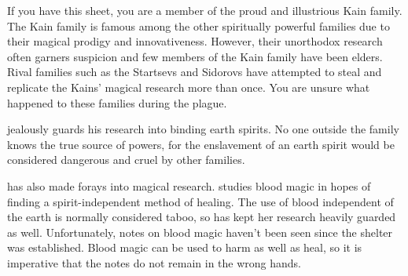 \documentclass[blue]{Pestilence}
\begin{document}
\name{\bKain{}}

If you have this sheet, you are a member of the proud and illustrious Kain family. The Kain family is famous among the other spiritually powerful families due to their magical prodigy and innovativeness. However, their unorthodox research often garners suspicion and few members of the Kain family have been elders. Rival families such as the Startsevs and Sidorovs have attempted to steal and replicate the Kains' magical research more than once. You are unsure what happened to these families during the plague.

\cElder{\intro} jealously guards his research into binding earth spirits. No one outside the family knows the true source of \cElder{\their} powers, for the enslavement of an earth spirit would be considered dangerous and cruel by other families.

 \cRebel{\intro} has also made forays into magical research. \cRebel{\They} studies blood magic in hopes of finding a spirit-independent method of healing. The use of blood independent of the earth is normally considered taboo, so \cRebel{\they} has kept her research heavily guarded as well. Unfortunately, \cRebel{\their} notes on blood magic haven't been seen since the shelter was established. Blood magic can be used to harm as well as heal, so it is imperative that the notes do not remain in the wrong hands. 
\end{document}
